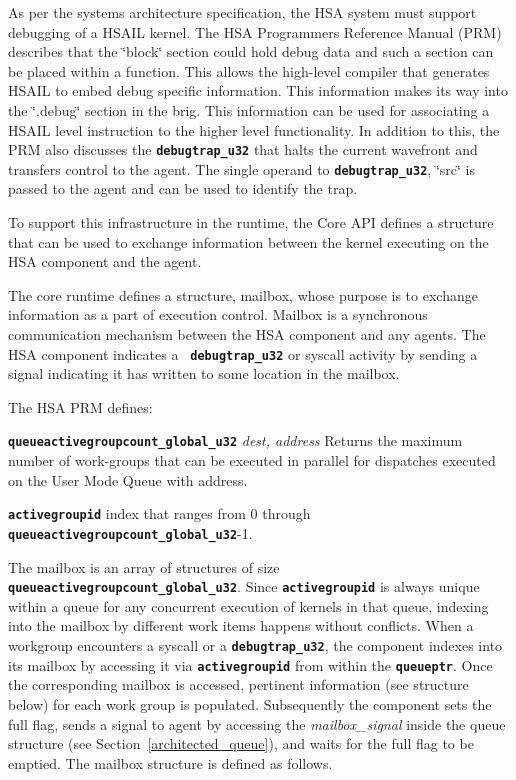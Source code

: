 \documentclass{book}
\newcommand{\diffblock}[1]{#1}
\newcommand{\ttbf}[1]{\diffblock{\texttt{\textbf{#1}}}}
\newcommand{\reffld}[1]{\textit{#1}}
\begin{document}
As per the systems architecture specification, the HSA system must
support debugging of a HSAIL kernel. The HSA
Programmers Reference Manual (PRM) describes that the
\char`\"{}block\char`\"{} section could hold debug data and such a
section can be placed within a function. This allows the
high-\/level compiler that generates HSAIL to embed debug
specific information. This information makes its way into the
\char`\"{}.\-debug\char`\"{} section in the brig. This information
can be used for associating a HSAIL level instruction to the
higher level functionality. In addition to this, the PRM also
discusses the \ttbf{debugtrap\_u32} that halts the current wavefront
and transfers control to the agent.  The single operand to
\ttbf{debugtrap\_u32}, \char`\"{}src\char`\"{} is passed to the
agent and can be used to identify the trap.

To support this infrastructure in the runtime, the Core API
defines a structure that can be used to exchange information between
the kernel executing on the HSA component and the agent.

The core runtime defines a structure, mailbox, whose purpose is to
exchange information as a part of execution control. Mailbox is a
synchronous communication mechanism between the HSA component
and any agents. The HSA component indicates a \ttbf{
debugtrap\_u32} or syscall activity by sending a signal indicating
it has written to some location in the mailbox.

The HSA PRM defines:

\begin{description}
\item \ttbf{queueactivegroupcount\_global\_u32}  {\itshape dest, address}
Returns the maximum number of work-groups that can be executed in
parallel for dispatches executed on the User Mode Queue with
address.

\item \ttbf{activegroupid} index that ranges from 0 through
\ttbf{queueactivegroupcount\_global\_u32}-1.
\end{description}

The mailbox is an array of structures of size
\ttbf{queueactivegroupcount\_global\_u32}. Since
\ttbf{activegroupid} is always unique within a queue for any
concurrent execution of kernels in that queue, indexing into the
mailbox by different work items happens without conflicts. When a
workgroup encounters a syscall or a \ttbf{debugtrap\_u32}, the
component indexes into its mailbox by accessing it via
\ttbf{activegroupid} from within the \ttbf{queueptr}. Once the
corresponding mailbox is accessed, pertinent information (see
structure below) for each work group is populated.  Subsequently the
component sets the full flag, sends a signal to agent by accessing the
\reffld{mailbox\_signal} inside the queue structure (see
Section~\ref{architected_queue}), and waits for the full flag to be
emptied. The mailbox structure is defined as follows.


\end{document}
